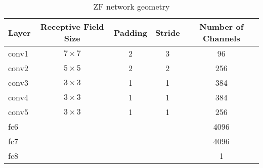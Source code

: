 \begin{table}[ht]
  \begin{tabular}{lcccc}
    \toprule
    \textbf{Layer} & \textbf{Receptive Field Size} & \textbf{Padding} & \textbf{Stride} & \textbf{Number of Channels}\\
    \midrule
    conv1&  $7\times 7$& 2& 3&   96\\
    conv2&  $5\times 5$& 2& 2&  256\\
    conv3&  $3\times 3$& 1& 1&  384\\
    conv4&  $3\times 3$& 1& 1&  384\\
    conv5&  $3\times 3$& 1& 1&  256\\
    fc6&               &  &  & 4096\\
    fc7&               &  &  & 4096\\
    fc8&               &  &  &    1\\
  \end{tabular}
  \caption{ZF network geometry}
  \label{tab:zf_geometry}
\end{table}

